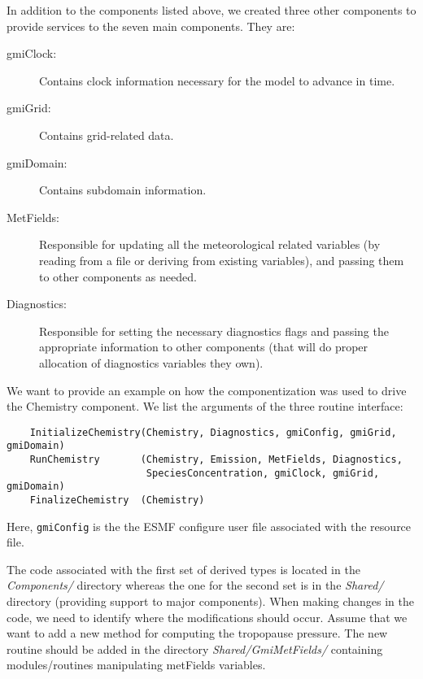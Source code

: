 In addition to the components listed above, we created three other components
to provide services to the seven main components.
They are:
\begin{description}
\item[gmiClock:] Contains clock information necessary for the model to advance in time.
\item[gmiGrid:] Contains grid-related data.
\item[gmiDomain:] Contains subdomain information.
\item[MetFields:] Responsible for updating all the meteorological related variables
     (by reading from a file or deriving from existing variables), and passing them
     to other components as needed.
\item[Diagnostics:] Responsible for setting the necessary diagnostics flags and
     passing the appropriate information to other components (that will do
     proper allocation of diagnostics variables they own).
\end{description}
%
\begin{example}
We want to provide an example on how the componentization was used to drive
the Chemistry component.
We list the arguments of the three routine interface:
\begin{verbatim}
    InitializeChemistry(Chemistry, Diagnostics, gmiConfig, gmiGrid, gmiDomain)
    RunChemistry       (Chemistry, Emission, MetFields, Diagnostics,
                        SpeciesConcentration, gmiClock, gmiGrid, gmiDomain)
    FinalizeChemistry  (Chemistry)
\end{verbatim}
Here, {\tt gmiConfig} is the the ESMF configure user file associated with the resource file.
\end{example}
%

\vskip 0.6cm

\noindent
The code associated with the first set of derived types is located in the 
{\em Components/} directory whereas the one for the second set is in the
{\em Shared/} directory (providing support to major components).
When making changes in the code, we need to identify where the modifications
should occur.
Assume that we want to add a new method for computing the tropopause pressure.
The new routine should be added in the directory {\em Shared/GmiMetFields/}
containing modules/routines manipulating metFields variables.

